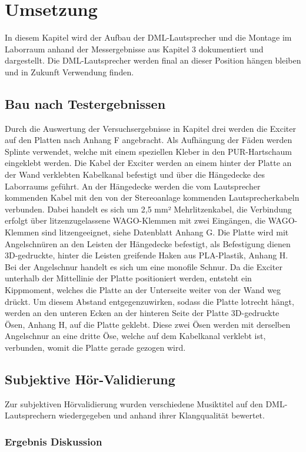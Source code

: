 \chapter{Umsetzung}

In diesem Kapitel wird der Aufbau der DML-Lautsprecher und die Montage im Laborraum anhand der Messergebnisse aus Kapitel 3 dokumentiert und dargestellt. Die DML-Lautsprecher werden final an dieser Position hängen bleiben und in Zukunft Verwendung finden. 

\section{Bau nach Testergebnissen}

Durch die Auswertung der Versuchsergebnisse in Kapitel drei werden die Exciter auf den Platten nach Anhang F angebracht. Als Aufhängung der Fäden werden Splinte verwendet, welche mit einem speziellen Kleber in den PUR-Hartschaum eingeklebt werden. Die Kabel der Exciter werden an einem hinter der Platte an der Wand verklebten Kabelkanal befestigt und über die Hängedecke des Laborraums geführt. An der Hängedecke werden die vom Lautsprecher kommenden Kabel mit den von der Stereoanlage kommenden Lautsprecherkabeln verbunden. Dabei handelt es sich um 2,5 mm² Mehrlitzenkabel, die Verbindung erfolgt über litzenzugelassene WAGO-Klemmen mit zwei Eingängen, die WAGO-Klemmen sind litzengeeignet, siehe Datenblatt Anhang G. Die Platte wird mit Angelschnüren an den Leisten der Hängedecke befestigt, als Befestigung dienen 3D-gedruckte, hinter die Leisten greifende Haken aus PLA-Plastik, Anhang H. Bei der Angelschnur handelt es sich um eine monofile Schnur. Da die Exciter unterhalb der Mittellinie der Platte positioniert werden, entsteht ein Kippmoment, welches die Platte an der Unterseite weiter von der Wand weg drückt. Um diesem Abstand entgegenzuwirken, sodass die Platte lotrecht hängt, werden an den unteren Ecken an der hinteren Seite der Platte 3D-gedruckte Ösen, Anhang H, auf die Platte geklebt. Diese zwei Ösen werden mit derselben Angelschnur an eine dritte Öse, welche auf dem Kabelkanal verklebt ist, verbunden, womit die Platte gerade gezogen wird. 

\section{Subjektive Hör-Validierung}

Zur subjektiven Hörvalidierung wurden verschiedene Musiktitel auf den DML-Lautsprechern wiedergegeben und anhand ihrer Klangqualität bewertet.


\subsection{Ergebnis Diskussion}



